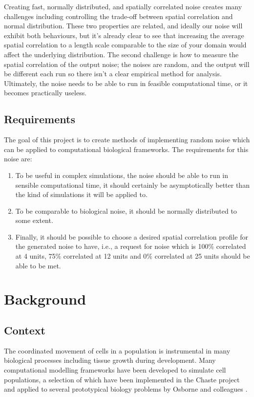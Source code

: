 \documentclass[11pt,a4paper]{article}
\begin{document}
Creating fast, normally distributed, and spatially correlated noise creates many challenges including controlling the trade-off between spatial correlation and normal distribution. These two properties are related, and ideally our noise will exhibit both behaviours, but it’s already clear to see that increasing the average spatial correlation to a length scale comparable to the size of your domain would affect the underlying distribution. The second challenge is how to measure the spatial correlation of the output noise; the noises are random, and the output will be different each run so there isn’t a clear empirical method for analysis. Ultimately, the noise needs to be able to run in feasible computational time, or it becomes practically useless.

\subsection{Requirements}

The goal of this project is to create methods of implementing random noise which can be applied to computational biological frameworks. The requirements for this noise are:
\begin{enumerate}
\item To be useful in complex simulations, the noise should be able to run in sensible computational time, it should certainly be asymptotically better than the kind of simulations it will be applied to.
\item To be comparable to biological noise, it should be normally distributed to some extent.
\item Finally, it should be possible to choose a desired spatial correlation profile for the generated noise to have, i.e., a request for noise which is 100\% correlated at 4 units, 75\% correlated at 12 units and 0\% correlated at 25 units should be able to be met.
\end{enumerate} 

\section{Background}

\subsection{Context}

The coordinated movement of cells in a population is instrumental in many biological processes including tissue growth during development. Many computational modelling frameworks have been developed to simulate cell populations, a selection of which have been implemented in the Chaste project \cite{chaste} and applied to several prototypical biology problems by Osborne and colleagues \cite{osbourne}.
\end{document}
